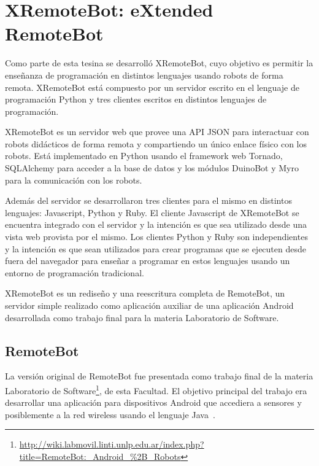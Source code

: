 \chapter{XRemoteBot: eXtended RemoteBot}\label{cha:xremotebot}

Como parte de esta tesina se desarrolló XRemoteBot, cuyo objetivo
es permitir la enseñanza de programación en distintos lenguajes usando
robots de forma remota. XRemoteBot está compuesto por un servidor
escrito en el lenguaje de programación Python y tres clientes escritos
en distintos lenguajes de programación.


XRemoteBot es un servidor web que provee una API JSON para interactuar
con robots didácticos de forma remota y compartiendo un único enlace
físico con los robots. Está implementado en Python usando el
framework web Tornado, SQLAlchemy para acceder a la base de datos
y los módulos DuinoBot y Myro para
la comunicación con los robots.

Además del servidor se desarrollaron tres clientes para el mismo en distintos
lenguajes: Javascript, Python y Ruby. El cliente Javascript de XRemoteBot
se encuentra
integrado con el servidor y la intención es que sea utilizado desde una
vista web provista por el mismo. Los clientes Python y Ruby
son independientes y la intención es que sean utilizados para crear programas
que se ejecuten desde fuera del navegador para enseñar
a programar en estos lenguajes usando un entorno de programación
tradicional.

XRemoteBot
es un rediseño y una reescritura completa de RemoteBot, un servidor
simple realizado como aplicación auxiliar de una aplicación Android
desarrollada
como trabajo final para la materia Laboratorio de Software.

\section{RemoteBot}\label{sec:remotebot}

La versión original de RemoteBot fue presentada como trabajo final
de la materia Laboratorio de
Software\footnote{\url{http://wiki.labmovil.linti.unlp.edu.ar/index.php?title=RemoteBot:_Android_\%2B_Robots}},
de esta Facultad.
El objetivo principal del trabajo era desarrollar una aplicación para
dispositivos Android que accediera a sensores y posiblemente a la red
wireless usando el lenguaje Java~\citep{queiruga_2013}.


